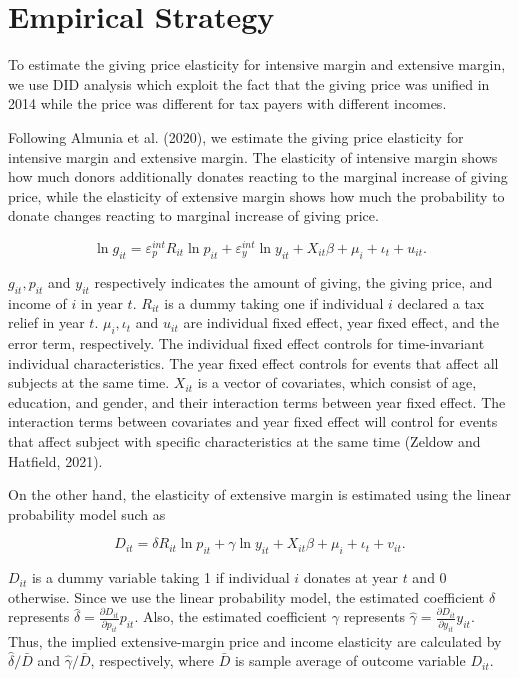 \documentclass[
  11pt,
  a4paper,
]{article}
\begin{document}
\hypertarget{empirical-strategy}{%
\section{Empirical Strategy}\label{empirical-strategy}}

To estimate the giving price elasticity for intensive margin and extensive margin, we use DID analysis which exploit the fact that the giving price was unified in 2014 while the price was different for tax payers with different incomes.

Following Almunia et al. (2020), we estimate the giving price elasticity for intensive margin and extensive margin. The elasticity of intensive margin shows how much donors additionally donates reacting to the marginal increase of giving price, while the elasticity of extensive margin shows how much the probability to donate changes reacting to marginal increase of giving price.

\begin{equation}
    \ln g_{it} = \varepsilon^{int}_p R_{it} \ln p_{it} + \varepsilon^{int}_y \ln y_{it} 
    + X_{it}\beta +\mu_i +\iota_t +u_{it}. \label{eq:intensive}
\end{equation}

\(g_{it}, p_{it}\) and \(y_{it}\) respectively indicates the amount of giving, the giving price, and income of \(i\) in year \(t\).
\(R_{it}\) is a dummy taking one if individual \(i\) declared a tax relief in year \(t\).
\(\mu_i, \iota_t\) and \(u_{it}\) are individual fixed effect, year fixed effect, and the error term, respectively.
The individual fixed effect controls for time-invariant individual characteristics. The year fixed effect controls for events that affect all subjects at the same time. \(X_{it}\) is a vector of covariates, which consist of age, education, and gender, and their interaction terms between year fixed effect. The interaction terms between covariates and year fixed effect will control for events that affect subject with specific characteristics at the same time (Zeldow and Hatfield, 2021).

On the other hand,
the elasticity of extensive margin is estimated using the linear probability model such as

\begin{equation}
D_{it} =  \delta R_{it} \ln p_{it} +\gamma \ln y_{it} + X_{it}\beta +\mu_i  +\iota_t +v_{it}. \label{eq:extensive}
\end{equation}

\(D_{it}\) is a dummy variable taking 1 if individual \(i\) donates at year \(t\) and 0 otherwise.
Since we use the linear probability model,
the estimated coefficient \(\delta\) represents \(\hat{\delta} = \frac{\partial D_{it}}{\partial p_{it}} p_{it}\).
Also, the estimated coefficient \(\gamma\) represents \(\hat{\gamma} = \frac{\partial D_{it}}{\partial y_{it}} y_{it}\).
Thus, the implied extensive-margin price and income elasticity are calculated by
\(\hat{\delta}/\bar{D}\) and \(\hat{\gamma}/\bar{D}\), respectively,
where \(\bar{D}\) is sample average of outcome variable \(D_{it}\).
\end{document}
